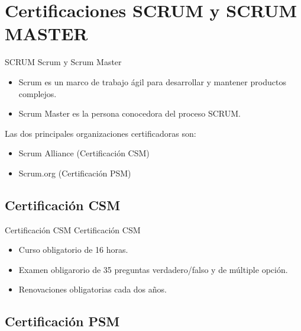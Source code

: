 \section{Certificaciones SCRUM y SCRUM MASTER}
\begin{frame}{SCRUM}
	Scrum y Scrum Master
	\begin{itemize}
		\item Scrum es un marco de trabajo ágil para desarrollar y mantener productos complejos.
		\item Scrum Master es la persona conocedora del proceso SCRUM.
	\end{itemize}

	\framebreak

	Las dos principales organizaciones certificadoras son:
	\begin{itemize}
		\item Scrum Alliance (Certificación CSM)
		\item Scrum.org (Certificación PSM)
	\end{itemize}

\end{frame}

\subsection{Certificación CSM}

\begin{frame}[allowframebreaks]{Certificación CSM}
	Certificación CSM 
	\begin{itemize}
		\item Curso obligatorio de 16 horas.
		\item Examen obligarorio de 35 preguntas verdadero/falso y de múltiple opción.
		\item Renovaciones obligatorias cada dos años.
	\end{itemize}

\end{frame}

\subsection{Certificación PSM}

